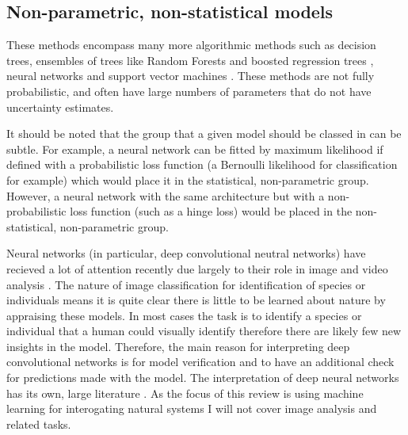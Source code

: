 \documentclass[10pt,]{article}
\begin{document}
\begin{figure*}[t]
{\begin{minipage}{1\textwidth}
\subsection{Non-parametric, non-statistical models}
These methods encompass many more algorithmic methods \citep{crisci2012review} such as decision trees, ensembles of trees like Random Forests \citep{breiman2001random} and boosted regression trees \citep{elith2008working, friedman2001greedy}, neural networks \citep{neuralnets} and support vector machines \citep{svm}. These methods are not fully probabilistic, and often have large numbers of parameters that do not have uncertainty estimates.

It should be noted that the group that a given model should be classed in can be subtle. For example, a neural network can be fitted by maximum likelihood if defined with a probabilistic loss function (a Bernoulli likelihood for classification for example) which would place it in the statistical, non-parametric group. However, a neural network with the same architecture but with a non-probabilistic loss function (such as a hinge loss) would be placed in the non-statistical, non-parametric group.

\end{minipage}

}
\normalcolor
\end{figure*}



Neural networks (in particular, deep convolutional neutral networks) have recieved a lot of attention recently due largely to their role in image and video analysis \citep{waldchen2018machine}. The nature of image classification for identification of species or individuals means it is quite clear there is little to be learned about nature by appraising these models. In most cases the task is to identify a species or individual that a human could visually identify \citep{waldchen2018machine, mac2018bat} therefore there are likely few new insights in the model. Therefore, the main reason for interpreting deep convolutional networks is for model verification and to have an additional check for predictions made with the model. The interpretation of deep neural networks has its own, large literature \citep{samek2017explainable, montavon2017methods}. As the focus of this review is using machine learning for interogating natural systems I will not cover image analysis and related tasks.
\end{document}
